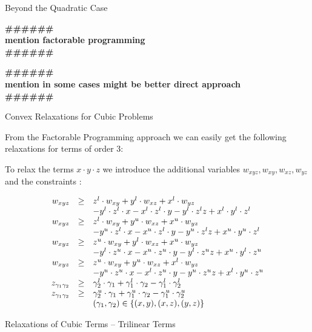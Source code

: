 \documentclass{beamer}
\newcommand{\todo}[1]
{\begin{tiny}
  \begin{center} {\color{red}
  \textbf{ {\#\#\#\hfill\#\#\#}\\{#1}\\\#\#\#\hfill\#\#\#}}
\end{center}
\end{tiny}} %
\begin{document}
\begin{frame}{Beyond the Quadratic Case}

  \todo{mention factorable programming}

  \todo{mention in some cases might be better direct approach}

\end{frame}

\begin{frame}{Convex Relaxations for Cubic Problems}

  From the Factorable Programming approach we can easily get the following relaxations for
  terms of order 3:

  To relax the terms $x \cdot y \cdot z$ we introduce the additional variables
  $w_{xyz}, w_{xy}, w_{xz}, w_{yz}$ and the constraints : 

  \begin{displaymath}
    \begin{array}[h]{rcl}
      w_{xyz} & \geq & z^l \cdot w_{xy}+ y^l \cdot w_{xz} + x^l \cdot w_{yz} \\
     &  & -y^l \cdot z^l \cdot x - x^l \cdot z^l \cdot y - y^l \cdot z^l z 
     + x^l \cdot y^l \cdot z^l \\
      w_{xyz} & \geq & z^l \cdot w_{xy}+ y^u \cdot w_{xz} + x^u \cdot w_{yz} \\
     &  & -y^u \cdot z^l \cdot x - x^u \cdot z^l \cdot y - y^u \cdot z^l z 
     + x^u \cdot y^u \cdot z^l \\
      w_{xyz} & \geq & z^u \cdot w_{xy}+ y^l \cdot w_{xz} + x^u \cdot w_{yz} \\
     &  & -y^l \cdot z^u \cdot x - x^u \cdot z^u \cdot y - y^l \cdot z^u z 
     + x^u \cdot y^l \cdot z^u \\
      w_{xyz} & \geq & z^u \cdot w_{xy}+ y^u \cdot w_{xz} + x^l \cdot w_{yz} \\
     &  & -y^u \cdot z^u \cdot x - x^l \cdot z^u \cdot y - y^u \cdot z^u z 
     + x^l \cdot y^u \cdot z^u \\
     z_{\gamma_1 \gamma_2} & \geq & \gamma_2^l \cdot \gamma_1 + \gamma_1^l \cdot \gamma_2
     - \gamma_1^l \cdot \gamma_2^l \\
     z_{\gamma_1 \gamma_2} & \geq & \gamma_2^u \cdot \gamma_1 + \gamma_1^u \cdot \gamma_2
     - \gamma_1^u \cdot \gamma_2^u \\
     &  &  (\gamma_1, \gamma_2) \in \left\{ (x,y), (x,z), (y,z) \right\} \\
    \end{array}
  \end{displaymath}
  
\end{frame}

\begin{frame}{Relaxations of Cubic Terms -- Trilinear Terms}

  
\end{frame}
\end{document}
